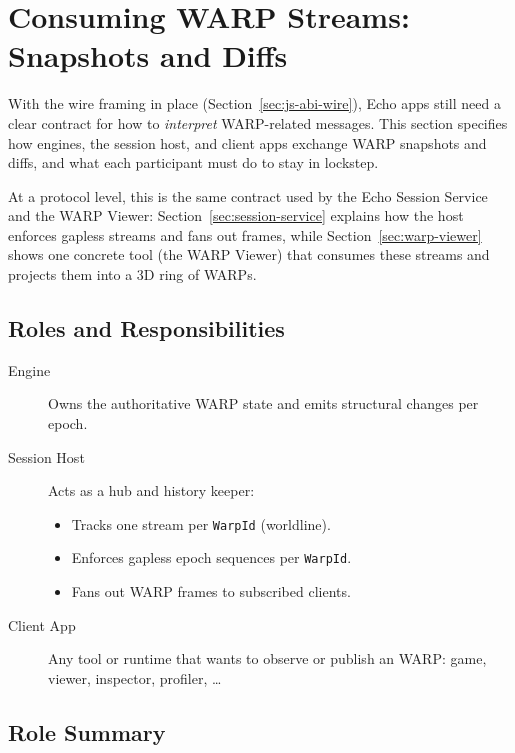 \section{Consuming WARP Streams: Snapshots and Diffs}
\label{sec:warp-stream-consumers}

With the wire framing in place (Section~\ref{sec:js-abi-wire}), Echo apps
still need a clear contract for how to \emph{interpret} WARP-related messages.
This section specifies how engines, the session host, and client apps exchange
WARP snapshots and diffs, and what each participant must do to stay in
lockstep.

At a protocol level, this is the same contract used by the Echo Session
Service and the WARP Viewer:
Section~\ref{sec:session-service} explains how the host enforces gapless
streams and fans out frames, while Section~\ref{sec:warp-viewer} shows one
concrete tool (the WARP Viewer) that consumes these streams and projects them
into a 3D ring of WARPs.

\subsection{Roles and Responsibilities}

\begin{description}
  \item[Engine] Owns the authoritative WARP state and emits structural
    changes per epoch.
  \item[Session Host] Acts as a hub and history keeper:
    \begin{itemize}
      \item Tracks one stream per \texttt{WarpId} (worldline).
      \item Enforces gapless epoch sequences per \texttt{WarpId}.
      \item Fans out WARP frames to subscribed clients.
    \end{itemize}
  \item[Client App] Any tool or runtime that wants to observe or publish an
    WARP: game, viewer, inspector, profiler, \dots
\end{description}

\subsection{Role Summary}

